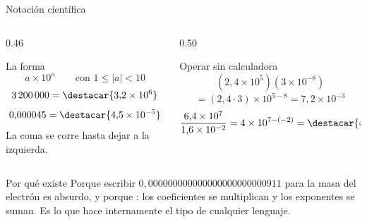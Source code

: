 \documentclass[aspectratio=169,10pt]{beamer}
\begin{document}
\begin{frame}{Notación científica}
  \scriptsize
  \begin{columns}[T,onlytextwidth]
    \begin{column}{0.46\textwidth}
      \begin{block}{La forma}
        \tiny
        \[ a \times 10^{n} \qquad \text{con } 1 \le |a| < 10 \]
        \[ 3\,200\,000 = \destacar{3{,}2\times 10^{6}} \]
        \[ 0{,}000045 = \destacar{4{,}5\times 10^{-5}} \]
        La coma se corre hasta dejar  a la izquierda.
      \end{block}
    \end{column}
    \begin{column}{0.50\textwidth}
      \begin{exampleblock}{Operar sin calculadora}
        \tiny
        \[ (2{,}4\times 10^{5})(3\times 10^{-8}) \]
        \[ = (2{,}4\cdot 3)\times 10^{5-8}
           = 7{,}2\times 10^{-3} \]
        \[ \frac{6{,}4\times 10^{7}}{1{,}6\times 10^{-2}}
           = 4\times 10^{7-(-2)} = \destacar{4\times 10^{9}} \]
      \end{exampleblock}
    \end{column}
  \end{columns}

  \vspace{0.1cm}
  \begin{alertblock}{Por qué existe}
    \scriptsize
    Porque escribir $0{,}000000000000000000000000911$ para la masa del
    electrón es absurdo, y porque : los coeficientes se multiplican y los
    exponentes se suman. Es lo que hace internamente el tipo
     de cualquier lenguaje.
  \end{alertblock}
\end{frame}
\end{document}

